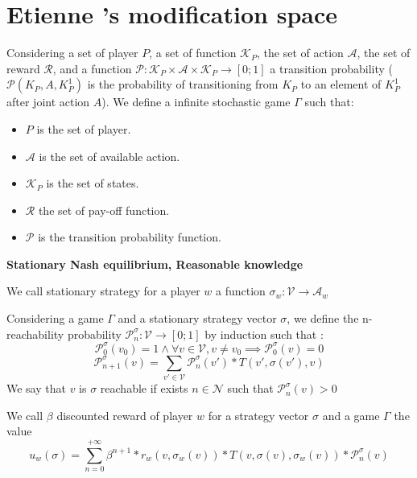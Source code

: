 \section{Etienne 's modification space}

\begin{mydef}
	Considering a set of player $P$, a set of function $\mathcal{K}_P$, the set of action $\mathcal{A}$, the set of reward $\mathcal{R}$, and a function $\mathcal{P} : \mathcal{K}_P \times \mathcal{A} \times \mathcal{K}_P \rightarrow [0;1]$ a transition probability ($\mathcal{P}(K_P,A,K_P^{1})$ is the probability of transitioning from $K_P$ to an element of $K_P^{1}$ after joint action $A$).
	We define a infinite stochastic game $\Gamma$  such that:
	\begin{itemize}
		\item $P$ is the set of player.
		\item $\mathcal{A}$ is the set of available action.
		\item $\mathcal{K}_P$ is the set of states.
		\item $\mathcal{R}$ the set of pay-off function.
		\item $\mathcal{P}$ is the transition probability function.
	\end{itemize}
\end{mydef}


\medskip
\noindent
\textbf{Stationary Nash equilibrium, Reasonable knowledge}

\begin{mydef}
	We call stationary strategy for a player $w$ a function $\sigma_w : \mathcal{V} \rightarrow \mathcal{A}_w$ 
\end{mydef}

\begin{mydef}
	Considering a game $\Gamma$ and a stationary strategy vector $\sigma$, 
	we define the n-reachability probability $\mathcal{P}^\sigma_n : \mathcal{V} \rightarrow [0;1]$ by induction such that :
		$$\mathcal{P}^\sigma_0(v_0) = 1 \land \forall v \in \mathcal{V},  v \neq v_0 \implies \mathcal{P}^\sigma_0(v) = 0$$
		$$\mathcal{P}^\sigma_{n+1}(v) = \sum_{v' \in \mathcal{V}} \mathcal{P}^\sigma_{n}(v') * T(v',\sigma(v'),v)$$
	We say that $v$ is $\sigma$ reachable if exists $n \in \mathcal{N}$ such that $\mathcal{P}^\sigma_{n}(v) > 0$
\end{mydef}

	


\begin{mydef}
	We call $\beta$ discounted reward of player $w$ for a strategy vector $\sigma$ and a game $\Gamma$ the value 
	$$u_w(\sigma) = 	\sum_{n=0}^{+\infty}\beta^{n+1} * r_w(v,\sigma_w(v)) * T(v,\sigma(v),\sigma_w(v))*\mathcal{P}^\sigma_{n}(v) $$
\end{mydef}

